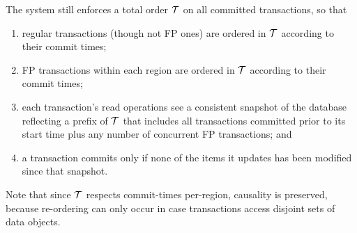 The system still enforces a total order ${\cal T}$ on all committed transactions, so that
\begin{enumerate}
    \setlength{\itemsep}{0pt}
    \setlength{\parskip}{0pt}
    \setlength{\parsep}{2pt}  
\item
regular transactions (though not FP ones) are ordered in ${\cal T}$  according to their commit times;
\item
FP transactions within each region are ordered in ${\cal T}$  according to their commit times;
\item
each transaction's read operations see a consistent snapshot of the database reflecting 
a prefix of  ${\cal T}$ that includes all transactions committed prior to
its start time plus any number of concurrent FP transactions; and 
\item
 a transaction commits only if none of the items it updates has been modified since that snapshot.
 \end{enumerate}

Note that since ${\cal T}$  respects commit-times per-region, causality is preserved, because 
re-ordering can only occur in case transactions access disjoint  sets of data objects.


